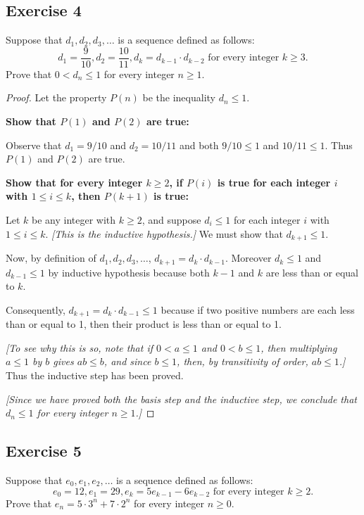 \documentclass[14pt]{extarticle}
\begin{document}
\subsection{Exercise 4}
Suppose that $d_1, d_2, d_3, \ldots$ is a sequence defined
as follows:
\[
    d_1 = \frac{9}{10}, d_2 = \frac{10}{11}, d_k = d_{k-1} \cdot d_{k-2} \text{ for every integer $k \geq 3$.}
\]
Prove that $0 < d_n \leq 1$ for every integer $n \geq 1$.

\begin{proof}
    Let the property $P(n)$ be the inequality $d_n \leq 1$.

        {\bf Show that $P(1)$ and $P(2)$ are true:}

    Observe that $d_1 = 9/10$ and $d_2 = 10/11$ and both $9/10 \leq 1$ and $10 / 11 \leq 1$. Thus $P(1)$ and $P(2)$ are true.

        {\bf Show that for every integer $k \geq 2$, if $P(i)$ is true for each integer $i$ with $1 \leq i \leq k$, then $P(k + 1)$ is true:}

    Let $k$ be any integer with $k \geq 2$, and suppose $d_i \leq 1$ for each integer $i$ with $1 \leq i \leq k$. {\it [This is the inductive hypothesis.]} We must show that $d_{k+1} \leq 1$.

    Now, by definition of $d_1, d_2, d_3, \ldots$, $d_{k+1} = d_k \cdot d_{k-1}$. Moreover $d_k \leq 1$ and $d_{k-1} \leq 1$ by inductive hypothesis because both $k - 1$ and $k$ are less than or equal to $k$.

    Consequently, $d_{k+1} = d_k \cdot d_{k-1} \leq 1$ because if two positive numbers are each less than or equal to 1, then their product is less than or equal to 1.

        {\it [To see why this is so, note that if $0 < a \leq 1$ and $0 < b \leq 1$, then multiplying $a \leq 1$ by $b$ gives $ab \leq b$, and since $b \leq 1$, then, by transitivity of order, $ab \leq 1$.]} Thus the inductive step has been proved.

        {\it [Since we have proved both the basis step and the inductive step, we conclude that $d_n \leq 1$ for every integer $n \geq 1$.]}
\end{proof}

\subsection{Exercise 5}
Suppose that $e_0, e_1, e_2, \ldots$ is a sequence defined
as follows:
\[
    e_0 = 12, e_1 = 29, e_k = 5e_{k-1} - 6e_{k-2} \text{ for every integer $k \geq 2$.}
\]
Prove that $e_n = 5 \cdot 3^n + 7 \cdot 2^n$ for every integer $n \geq 0$.
\end{document}
